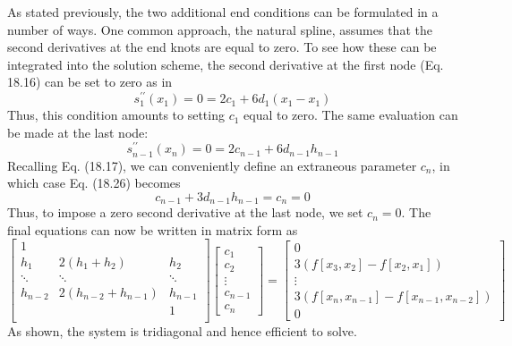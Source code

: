 \documentclass[../main.tex]{subfiles}
\begin{document}
As stated previously, the two additional end conditions can be formulated in a number of ways. One common approach, the natural spline, assumes that the second derivatives at the end knots are equal to zero. To see how these can be integrated into the solution scheme, the second derivative at the first node (Eq. 18.16) can be set to zero as in
\begin{equation}
s_{1}^{\prime \prime}\left(x_{1}\right)=0=2 c_{1}+6 d_{1}\left(x_{1}-x_{1}\right)\nonumber
\end{equation}
Thus, this condition amounts to setting $c_{1}$ equal to zero.
The same evaluation can be made at the last node:
\begin{equation}
    \tag{18.26}
s_{n-1}^{\prime \prime}\left(x_{n}\right)=0=2 c_{n-1}+6 d_{n-1} h_{n-1}
\end{equation}
Recalling Eq. (18.17), we can conveniently define an extraneous parameter $c_{n}$, in which case Eq. (18.26) becomes
\begin{equation}
c_{n-1}+3 d_{n-1} h_{n-1}=c_{n}=0 \nonumber
\end{equation}
Thus, to impose a zero second derivative at the last node, we set $c_{n}=0$.
The final equations can now be written in matrix form as
\begin{equation}
    \tag{18.27}
    \begin{bmatrix}
      1 & &\\
      h_{1} & 2(h_{1}+h_{2}) & h_{2}\\
      \ddots & \ddots & \ddots\\
      h_{n-2} & 2(h_{n-2}+h_{n-1}) & h_{n-1}\\
      & & 1\\
   \end{bmatrix}
   \begin{bmatrix}
    c_{1}\\c_{2}\\ \vdots\\c_{n-1}\\c_{n}
 \end{bmatrix}
 =
 \begin{bmatrix}
    0\\
    3\left(f\left[x_{3}, x_{2}\right]-f\left[x_{2}, x_{1}\right]\right) \\
    \vdots\\
    3\left(f\left[x_{n}, x_{n-1}\right]-f\left[x_{n-1}, x_{n-2}\right]\right)\\
    0
 \end{bmatrix}
   \end{equation}
   As shown, the system is tridiagonal and hence efficient to solve.
\end{document}
